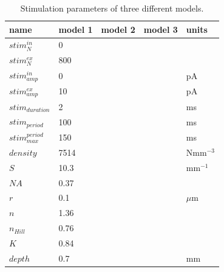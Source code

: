 \documentclass[11pt]{article}
\begin{document}
\begin{table}
\centering
\begin{tabular}{lllll}
\toprule
name &    model 1 &    model 2 &    model 3 &       units \\
\midrule
$stim_{N}^{in}$       &          0 &           &           &             \\
$stim_{N}^{ex}$       &        800 &         &         &             \\
$stim_{amp}^{in}$     &          0 &           &           &          pA \\
$stim_{amp}^{ex}$     &         10 &          &          &          pA \\
$stim_{duration}$     &          2 &           &           &          ms \\
$stim_{period}$       &        100 &         &         &          ms \\
$stim_{max}^{period}$ &        150 &         &         &          ms \\

$density$             &     7514 &      &      &  Nmm$^{-3}$ \\
$S$                   &       10.3 &       &      &   mm$^{-1}$ \\
$NA$                  &       0.37 &       &       &             \\
$r$                   &        0.1 &         &         &      $\mu$m \\
$n$                   &       1.36 &        &        &             \\
$n_{Hill}$            &        0.76 &        &        &             \\
$K$                   &       0.84 &        &        &             \\
$depth$               &       0.7 &        &        &             mm\\
\bottomrule
\end{tabular}
\caption{\label{tab:params_stim} Stimulation parameters of three different models.}
\end{table}
\end{document}
